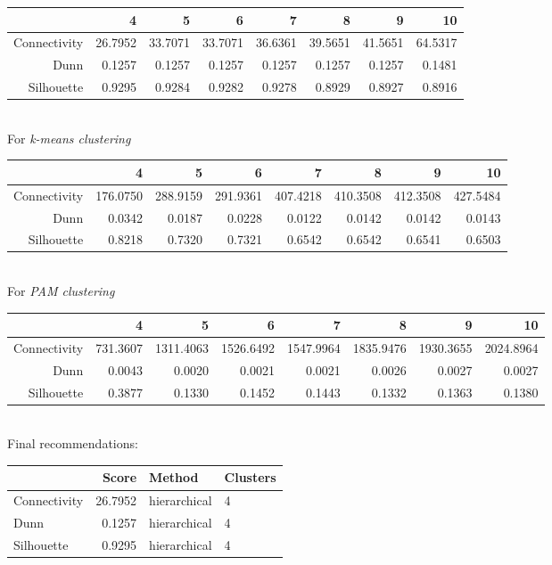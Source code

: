 \documentclass[11p]{article}
\begin{document}
\begin{table}[ht]
\centering
\begin{tabular}{rrrrrrrr}
  \hline
 & 4 & 5 & 6 & 7 & 8 & 9 & 10 \\ 
  \hline
Connectivity & 26.7952 & 33.7071 & 33.7071 & 36.6361 & 39.5651 & 41.5651 & 64.5317 \\ 
  Dunn & 0.1257 & 0.1257 & 0.1257 & 0.1257 & 0.1257 & 0.1257 & 0.1481 \\ 
  Silhouette & 0.9295 & 0.9284 & 0.9282 & 0.9278 & 0.8929 & 0.8927 & 0.8916 \\ 
   \hline
\end{tabular}
\end{table}\\
For {\emph{k-means clustering}}\\
\begin{table}[ht]
\centering
\begin{tabular}{rrrrrrrr}
  \hline
 & 4 & 5 & 6 & 7 & 8 & 9 & 10 \\ 
  \hline
Connectivity & 176.0750 & 288.9159 & 291.9361 & 407.4218 & 410.3508 & 412.3508 & 427.5484 \\ 
  Dunn & 0.0342 & 0.0187 & 0.0228 & 0.0122 & 0.0142 & 0.0142 & 0.0143 \\ 
  Silhouette & 0.8218 & 0.7320 & 0.7321 & 0.6542 & 0.6542 & 0.6541 & 0.6503 \\ 
   \hline
\end{tabular}
\end{table}\\
For {\emph{PAM clustering}}\\
\begin{table}[ht]
\centering
\begin{tabular}{rrrrrrrr}
  \hline
 & 4 & 5 & 6 & 7 & 8 & 9 & 10 \\ 
  \hline
Connectivity & 731.3607 & 1311.4063 & 1526.6492 & 1547.9964 & 1835.9476 & 1930.3655 & 2024.8964 \\ 
  Dunn & 0.0043 & 0.0020 & 0.0021 & 0.0021 & 0.0026 & 0.0027 & 0.0027 \\ 
  Silhouette & 0.3877 & 0.1330 & 0.1452 & 0.1443 & 0.1332 & 0.1363 & 0.1380 \\ 
   \hline
\end{tabular}
\end{table}\\
Final recommendations:
\begin{table}[H]
\centering
\begin{tabular}{lrll}
\hline
& Score & Method & Clusters \\
\hline
Connectivity & 26.7952 & hierarchical & 4 \\
Dunn & 0.1257 & hierarchical & 4 \\
Silhouette & 0.9295 & hierarchical & 4 \\
\hline
\end{tabular}
\end{table}


\newpage

%
\end{document}
